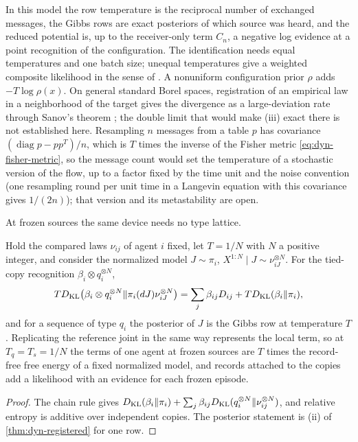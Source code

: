 In this model the row temperature is the reciprocal number of exchanged messages, the Gibbs rows are exact posteriors of which source was heard, and the reduced potential is, up to the receiver-only term $C_n$, a negative log evidence at a point recognition of the configuration. The identification needs equal temperatures and one batch size; unequal temperatures give a weighted composite likelihood in the sense of \citet{BissiriHolmesWalker2016}. A nonuniform configuration prior $\rho$ adds $-T\log\rho(x)$. On general standard Borel spaces, registration of an empirical law in a neighborhood of the target gives the divergence as a large-deviation rate through Sanov's theorem \citep{Csiszar1984}; the double limit that would make (iii) exact there is not established here. Resampling $n$ messages from a table $p$ has covariance $(\operatorname{diag}p-pp^T)/n$, which is $T$ times the inverse of the Fisher metric \cref{eq:dyn-fisher-metric}, so the message count would set the temperature of a stochastic version of the flow, up to a factor fixed by the time unit and the noise convention (one resampling round per unit time in a Langevin equation with this covariance gives $1/(2n)$); that version and its metastability are open.

At frozen sources the same device needs no type lattice.

Hold the compared laws $\nu_{ij}$ of agent $i$ fixed, let $T=1/N$ with $N$ a positive integer, and consider the normalized model $J\sim\pi_i$, $X^{1:N}\mid J\sim\nu_{iJ}^{\otimes N}$. For the tied-copy recognition $\beta_i\otimes q_i^{\otimes N}$,
\begin{equation}
 TD_{\mathrm{KL}}\bigl(\beta_i\otimes q_i^{\otimes N}\Vert\pi_i(dJ)\nu_{iJ}^{\otimes N}\bigr)
 =\sum_j\beta_{ij}D_{ij}+TD_{\mathrm{KL}}(\beta_i\Vert\pi_i),
 \label{eq:dyn-frozen-source}
\end{equation}
and for a sequence of type $q_i$ the posterior of $J$ is the Gibbs row at temperature $T$. Replicating the reference joint in the same way represents the local term, so at $T_q=T_s=1/N$ the terms of one agent at frozen sources are $T$ times the record-free free energy of a fixed normalized model, and records attached to the copies add a likelihood with an evidence for each frozen episode.
\begin{proof}
The chain rule gives $D_{\mathrm{KL}}(\beta_i\Vert\pi_i)+\sum_j\beta_{ij}D_{\mathrm{KL}}(q_i^{\otimes N}\Vert\nu_{ij}^{\otimes N})$, and relative entropy is additive over independent copies. The posterior statement is (ii) of \cref{thm:dyn-registered} for one row.
\end{proof}


